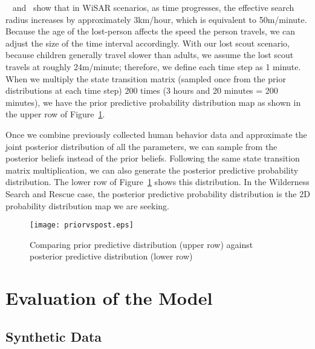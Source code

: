 ~\cite{Setnicka1980Wilderness} and~\cite{Syrotuck2000Introduction} show that in WiSAR scenarios, as time progresses, the effective search radius increases by approximately 3km/hour, which is equivalent to 50m/minute. Because the age of the lost-person affects the speed the person travels, we can adjust the size of the time interval accordingly. With our lost scout scenario, because children generally travel slower than adults, we assume the lost scout travels at roughly 24m/minute; therefore, we define each time step as 1 minute. When we multiply the state transition matrix (sampled once from the prior distributions at each time step) 200 times (3 hours and 20 minutes = 200 minutes), we have the prior predictive probability distribution map as shown in the upper row of Figure~\ref{priorvspost}.

Once we combine previously collected human behavior data and approximate the joint posterior distribution of all the parameters, we can sample from the posterior beliefs instead of the prior beliefs. Following the same state transition matrix multiplication, we can also generate the posterior predictive probability distribution. The lower row of Figure~\ref{priorvspost} shows this distribution. In the Wilderness Search and Rescue case, the posterior predictive probability distribution is the 2D probability distribution map we are seeking.

\begin{figure}
\centering
\texttt{[image: priorvspost.eps]}
\caption[Comparing prior distribution against posterior distribution]{Comparing prior predictive distribution (upper row) against posterior predictive distribution (lower row)}
\label{priorvspost}
\end{figure}

\section{Evaluation of the Model}
\label{sec:4}

\subsection{Synthetic Data}
\label{sec:4.1}

